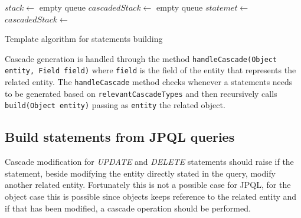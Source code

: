 \begin{algorithm}[h]
  \scriptsize
  \begin{algorithmic}[1]
    \State $stack \gets$ empty queue
    \State $cascadedStack \gets$ empty queue
	\State $statemet \gets$ 
    \State {}
          \State $cascadedStack \gets$ 
        \EndIf
          \State {}
        \Else
        	  \State {}
        	\EndIf
      \Else
          \State {}
        	\EndIf
      \EndIf
          \State {}
        \Else
          \State {}
        \EndIf
    \EndFor        
    \State {}
      \State {}
    \EndIf
  \EndFunction
  \end{algorithmic}
  \caption{Template algorithm for statements building}
  \label{code:statements-building}
\end{algorithm}

\noindent Cascade generation is handled through the method \texttt{handleCascade(Object entity, Field field)} where \texttt{field} is the field of the entity that represents the related entity. The \texttt{handleCascade} method checks whenever a statements needs to be generated based on \texttt{relevantCascadeTypes} and then recursively calls \texttt{build(Object entity)} passing as \texttt{entity} the related object. 

\subsection{Build statements from JPQL queries}
Cascade modification for \textit{UPDATE} and \textit{DELETE} statements should raise if the statement, beside modifying the entity directly stated in the query, modify another related entity. Fortunately this is not a possible case for JPQL, for the object case this is possible since objects keeps reference to the related entity and if that has been modified, a cascade operation should be performed.
 
